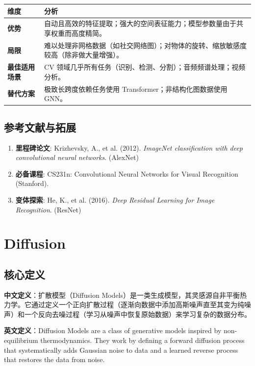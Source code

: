 \documentclass[12pt, a4paper]{book}
\begin{document}
\begin{table}[h]
\centering
\begin{tabularx}{\textwidth}{|l|X|}
\hline
\textbf{维度} & \textbf{分析} \\
\hline
\textbf{优势} & 自动且高效的特征提取；强大的空间表征能力；模型参数量由于共享权重而高度精简。 \\
\hline
\textbf{局限} & 难以处理非网格数据（如社交网络图）；对物体的旋转、缩放敏感度较高（除非做大量增强）。 \\
\hline
\textbf{最佳适用场景} & CV 领域几乎所有任务（识别、检测、分割）；音频频谱处理；视频分析。 \\
\hline
\textbf{替代方案} & 极致长跨度依赖任务使用 Transformer；非结构化图数据使用 GNN。 \\
\hline
\end{tabularx}
\end{table}

\section{参考文献与拓展}
\begin{enumerate}
    \item \textbf{里程碑论文}: Krizhevsky, A., et al. (2012). \textit{ImageNet classification with deep convolutional neural networks}. (AlexNet)
    \item \textbf{必备课程}: CS231n: Convolutional Neural Networks for Visual Recognition (Stanford).
    \item \textbf{变体探索}: He, K., et al. (2016). \textit{Deep Residual Learning for Image Recognition}. (ResNet)
\end{enumerate}

\chapter{Diffusion}


\section{核心定义}
\textbf{中文定义}：扩散模型（Diffusion Models）是一类生成模型，其灵感源自非平衡热力学。它通过定义一个正向扩散过程（逐渐向数据中添加高斯噪声直至其变为纯噪声）和一个反向去噪过程（学习从噪声中恢复原始数据）来学习复杂的数据分布。

\textbf{英文定义}：Diffusion Models are a class of generative models inspired by non-equilibrium thermodynamics. They work by defining a forward diffusion process that systematically adds Gaussian noise to data and a learned reverse process that restores the data from noise.
\end{document}
